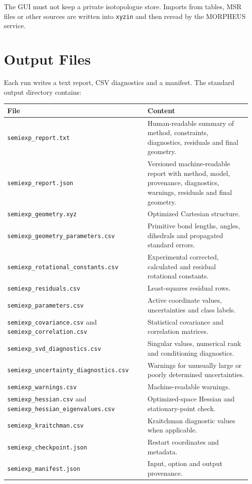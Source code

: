 \documentclass[11pt]{article}
\newcommand{\xyzin}{\texttt{xyzin}}
\begin{document}
The GUI must not keep a private isotopologue store.  Imports from tables, MSR
files or other sources are written into \xyzin{} and then reread by the MORPHEUS
service.

\section{Output Files}

Each run writes a text report, CSV diagnostics and a manifest.  The standard
output directory contains:

\begin{longtable}{@{}p{}p{}@{}}
\toprule
File & Content \\
\midrule
\endhead
\texttt{semiexp\_report.txt} & Human-readable summary of method, constraints,
diagnostics, residuals and final geometry. \\
\texttt{semiexp\_report.json} & Versioned machine-readable report with method,
model, provenance, diagnostics, warnings, residuals and final geometry. \\
\texttt{semiexp\_geometry.xyz} & Optimized Cartesian structure. \\
\texttt{semiexp\_geometry\_parameters.csv} & Primitive bond lengths, angles,
dihedrals and propagated standard errors. \\
\texttt{semiexp\_rotational\_constants.csv} & Experimental corrected,
calculated and residual rotational constants. \\
\texttt{semiexp\_residuals.csv} & Least-squares residual rows. \\
\texttt{semiexp\_parameters.csv} & Active coordinate values, uncertainties
and class labels. \\
\texttt{semiexp\_covariance.csv} and \texttt{semiexp\_correlation.csv} &
Statistical covariance and correlation matrices. \\
\texttt{semiexp\_svd\_diagnostics.csv} & Singular values, numerical rank and
conditioning diagnostics. \\
\texttt{semiexp\_uncertainty\_diagnostics.csv} & Warnings for unusually large
or poorly determined uncertainties. \\
\texttt{semiexp\_warnings.csv} & Machine-readable warnings. \\
\texttt{semiexp\_hessian.csv} and
\texttt{semiexp\_hessian\_eigenvalues.csv} & Optimized-space Hessian and
stationary-point check. \\
\texttt{semiexp\_kraitchman.csv} & Kraitchman diagnostic values when
applicable. \\
\texttt{semiexp\_checkpoint.json} & Restart coordinates and metadata. \\
\texttt{semiexp\_manifest.json} & Input, option and output provenance. \\
\bottomrule
\end{longtable}
\end{document}
